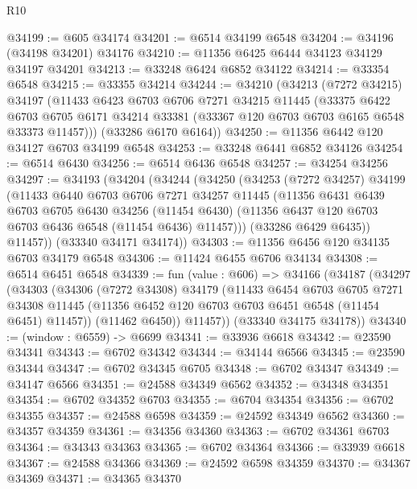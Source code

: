 \begin{lexlean}{R10}
\begin{coremodule}
@34199 := @605 @34174
@34201 := @6514 @34199 @6548
@34204 := @34196 (@34198 @34201) @34176
@34210 := @11356 @6425 @6444 @34123 @34129 @34197 @34201
@34213 := @33248 @6424 @6852 @34122
@34214 := @33354 @6548
@34215 := @33355 @34214
@34244 := @34210
    (@34213
      (@7272 @34215)
      @34197
      (@11433
        @6423
        @6703
        @6706
        @7271
        @34215
        @11445
        (@33375
          @6422
          @6703
          @6705
          @6171
          @34214
          @33381
          (@33367 @120 @6703 @6703 @6165 @6548 @33373 @11457)))
      (@33286 @6170 @6164))
@34250 := @11356 @6442 @120 @34127 @6703 @34199 @6548
@34253 := @33248 @6441 @6852 @34126
@34254 := @6514 @6430
@34256 := @6514 @6436 @6548
@34257 := @34254 @34256
@34297 := @34193
    (@34204
      (@34244
        (@34250
          (@34253
            (@7272 @34257)
            @34199
            (@11433
              @6440
              @6703
              @6706
              @7271
              @34257
              @11445
              (@11356
                @6431
                @6439
                @6703
                @6705
                @6430
                @34256
                (@11454 @6430)
                (@11356 @6437 @120 @6703 @6703 @6436 @6548 (@11454 @6436) @11457)))
            (@33286 @6429 @6435))
          @11457))
      (@33340 @34171 @34174))
@34303 := @11356 @6456 @120 @34135 @6703 @34179 @6548
@34306 := @11424 @6455 @6706 @34134
@34308 := @6514 @6451 @6548
@34339 := fun (value : @606) =>
  @34166
    (@34187
      (@34297
        (@34303
          (@34306
            (@7272 @34308)
            @34179
            (@11433
              @6454
              @6703
              @6705
              @7271
              @34308
              @11445
              (@11356 @6452 @120 @6703 @6703 @6451 @6548 (@11454 @6451) @11457))
            (@11462 @6450))
          @11457))
      (@33340 @34175 @34178))
@34340 := (window : @6559) -> @6699
@34341 := @33936 @6618
@34342 := @23590 @34341
@34343 := @6702 @34342
@34344 := @34144 @6566
@34345 := @23590 @34344
@34347 := @6702 @34345 @6705
@34348 := @6702 @34347
@34349 := @34147 @6566
@34351 := @24588 @34349 @6562
@34352 := @34348 @34351
@34354 := @6702 @34352 @6703
@34355 := @6704 @34354
@34356 := @6702 @34355
@34357 := @24588 @6598
@34359 := @24592 @34349 @6562
@34360 := @34357 @34359
@34361 := @34356 @34360
@34363 := @6702 @34361 @6703
@34364 := @34343 @34363
@34365 := @6702 @34364
@34366 := @33939 @6618
@34367 := @24588 @34366
@34369 := @24592 @6598 @34359
@34370 := @34367 @34369
@34371 := @34365 @34370

\end{coremodule}
\end{lexlean}
